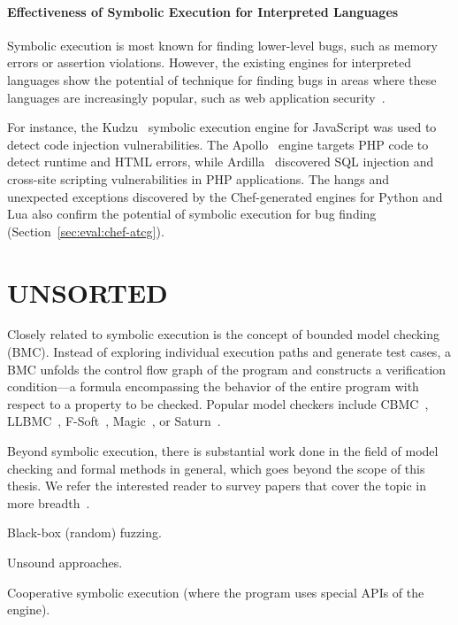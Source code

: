 \paragraph{Effectiveness of Symbolic Execution for Interpreted Languages}

Symbolic execution is most known for finding lower-level bugs, such as memory errors or assertion violations.  However, the existing engines for interpreted languages show the potential of technique for finding bugs in areas where these languages are increasingly popular, such as web application security~\cite{saxena-kudzu,artzi-apollo, kiezun-ardilla}.

For instance, the Kudzu~\cite{saxena-kudzu} symbolic execution engine for JavaScript was used to detect code injection vulnerabilities.  The Apollo~\cite{artzi-apollo} engine targets PHP code to detect runtime and HTML errors, while Ardilla~\cite{kiezun-ardilla} discovered SQL injection and cross-site scripting vulnerabilities in PHP applications.
%
The hangs and unexpected exceptions discovered by the Chef-generated engines for Python and Lua also confirm the potential of symbolic execution for bug finding (Section~\ref{sec:eval:chef-atcg}).


\iffalse
\section{UNSORTED}

Closely related to symbolic execution is the concept of bounded model checking (BMC).  Instead of exploring individual execution paths and generate test cases, a BMC unfolds the control flow graph of the program and constructs a verification condition---a formula encompassing the behavior of the entire program with respect to a property to be checked.  Popular model checkers include CBMC~\cite{cbmc}, LLBMC~\cite{llbmc2012}, F-Soft~\cite{f-soft}, Magic~\cite{magic}, or Saturn~\cite{saturn}.

Beyond symbolic execution, there is substantial work done in the field of model checking and formal methods in general, which goes beyond the scope of this thesis.  We refer the interested reader to survey papers that cover the topic in more breadth~\cite{jhala2009software, woodcock2009formal}.

Black-box (random) fuzzing.

Unsound approaches.

Cooperative symbolic execution (where the program uses special APIs of the engine).

